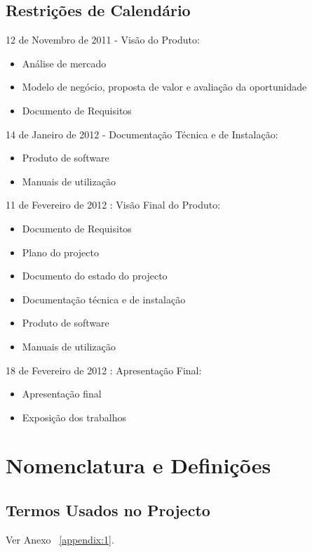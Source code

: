 \subsection{Restrições de Calendário}
\begin{description}
    \item 12 de Novembro de 2011 - Visão do Produto: 
        \begin{itemize}
            \item Análise de mercado
            \item Modelo de negócio, proposta de valor e avaliação da oportunidade
            \item Documento de Requisitos
        \end{itemize}
    \item 14 de Janeiro de 2012 - Documentação Técnica e de Instalação: 
        \begin{itemize}
            \item Produto de software
            \item Manuais de utilização
        \end{itemize}
    \item 11 de Fevereiro de 2012 : Visão Final do Produto:
        \begin{itemize}
            \item Documento de Requisitos
            \item Plano do projecto
            \item Documento do estado do projecto
            \item Documentação técnica e de instalação
            \item Produto de software
            \item Manuais de utilização
        \end{itemize}
    \item 18 de Fevereiro de 2012 : Apresentação Final: 
        \begin{itemize}
            \item Apresentação final
            \item Exposição dos trabalhos
        \end{itemize}
\end{description}

\section{Nomenclatura e Definições}
\subsection{Termos Usados no Projecto}

Ver Anexo ~\ref{appendix:1}.
